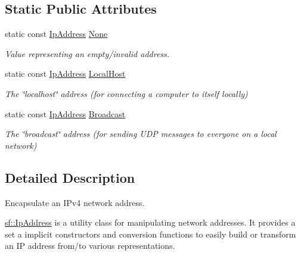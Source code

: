 \subsection*{Static Public Attributes}
\begin{DoxyCompactItemize}
\item 
\hypertarget{classsf_1_1IpAddress_a4619b4abbe3c8fef056e7299db967404}{static const \hyperlink{classsf_1_1IpAddress}{Ip\-Address} \hyperlink{classsf_1_1IpAddress_a4619b4abbe3c8fef056e7299db967404}{None}}\label{classsf_1_1IpAddress_a4619b4abbe3c8fef056e7299db967404}

\begin{DoxyCompactList}\small\item\em Value representing an empty/invalid address. \end{DoxyCompactList}\item 
\hypertarget{classsf_1_1IpAddress_a594d3a8e2559f8fa8ab0a96fa597333b}{static const \hyperlink{classsf_1_1IpAddress}{Ip\-Address} \hyperlink{classsf_1_1IpAddress_a594d3a8e2559f8fa8ab0a96fa597333b}{Local\-Host}}\label{classsf_1_1IpAddress_a594d3a8e2559f8fa8ab0a96fa597333b}

\begin{DoxyCompactList}\small\item\em The \char`\"{}localhost\char`\"{} address (for connecting a computer to itself locally) \end{DoxyCompactList}\item 
\hypertarget{classsf_1_1IpAddress_aa93d1d57b65d243f2baf804b6035465c}{static const \hyperlink{classsf_1_1IpAddress}{Ip\-Address} \hyperlink{classsf_1_1IpAddress_aa93d1d57b65d243f2baf804b6035465c}{Broadcast}}\label{classsf_1_1IpAddress_aa93d1d57b65d243f2baf804b6035465c}

\begin{DoxyCompactList}\small\item\em The \char`\"{}broadcast\char`\"{} address (for sending U\-D\-P messages to everyone on a local network) \end{DoxyCompactList}\end{DoxyCompactItemize}


\subsection{Detailed Description}
Encapsulate an I\-Pv4 network address. 

\hyperlink{classsf_1_1IpAddress}{sf\-::\-Ip\-Address} is a utility class for manipulating network addresses. It provides a set a implicit constructors and conversion functions to easily build or transform an I\-P address from/to various representations.

